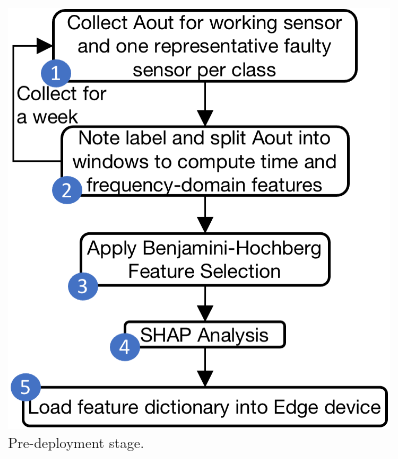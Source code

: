 \begin{figure}
	\begin{minipage}[t]{0.26\textwidth}
		\centering
		\includegraphics[width=0.9\textwidth]{figures/deployment/predeployment-stage-2.png}
		\caption{\footnotesize{Pre-deployment stage}.}
		\label{fig:pre_deployment_steps}
	\end{minipage}%
	\hfill
    \begin{minipage}[t]{0.22\textwidth}
		\centering

\end{minipage}
\end{figure}
